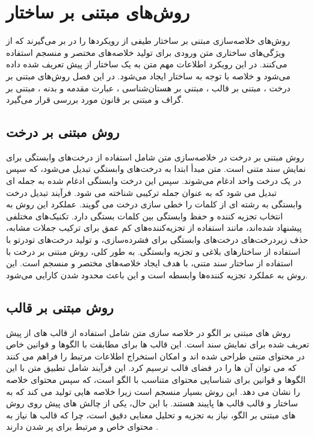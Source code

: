\chapter{روش‌های مبتنی بر ساختار}

روش‌های خلاصه‌سازی مبتنی بر ساختار طیفی از رویکردها را در بر می‌گیرند که از ویژگی‌های ساختاری متن ورودی برای تولید خلاصه‌های مختصر و منسجم استفاده می‌کنند. در این رویکرد اطلاعات مهم متن به یک ساختار از پیش تعریف شده داده می‌شود و خلاصه با توجه به ساختار ایجاد می‌شود. در این فصل روش‌های مبتنی بر درخت 
، مبتنی بر قالب
، مبتنی بر هستان‌شناسی
، عبارت مقدمه و بدنه
، مبتنی بر گراف 
و مبتنی بر قانون
 مورد بررسی قرار می‌گیرد. 
 
\section{روش مبتنی بر درخت}
روش مبتنی بر درخت در خلاصه‌سازی متن شامل استفاده از درخت‌های وابستگی برای نمایش سند متنی است. متن مبدأ ابتدا به درخت‌های وابستگی تبدیل می‌شود، که سپس در یک درخت واحد ادغام می‌شوند. سپس این درخت وابستگی ادغام شده به جمله ای تبدیل می شود که به عنوان جمله ترکیبی شناخته می شود. فرآیند تبدیل درخت وابستگی به رشته ای از کلمات را خطی سازی درخت می گویند. عملکرد این روش به انتخاب تجزیه کننده و حفظ وابستگی بین کلمات بستگی دارد. تکنیک‌های مختلفی پیشنهاد شده‌اند، مانند استفاده از تجزیه‌کننده‌های کم عمق برای ترکیب جملات مشابه، حذف زیردرخت‌های درخت‌های وابستگی برای فشرده‌سازی، و تولید درخت‌های تودرتو با استفاده از ساختارهای بلاغی و تجزیه وابستگی. به طور کلی، روش مبتنی بر درخت با استفاده از ساختار سند متنی، با هدف ایجاد خلاصه‌های مختصر و منسجم است.
این روش به عملکرد  تجزیه کننده‌ها وابسطه است و این باعث محدود شدن کارایی می‌شود\cite{andhale2016overview}.

\section{روش مبتنی بر قالب}
روش های مبتنی بر الگو در خلاصه سازی متن شامل استفاده از قالب های از پیش تعریف شده برای نمایش سند است. این قالب ها برای مطابقت با الگوها و قوانین خاص در محتوای متنی طراحی شده اند و امکان استخراج اطلاعات مرتبط را فراهم می کنند که می توان آن ها را در فضای قالب ترسیم کرد. این فرآیند شامل تطبیق متن با این الگوها و قوانین برای شناسایی محتوای متناسب با الگو است، که سپس محتوای خلاصه را نشان می دهد. این روش بسیار منسجم است زیرا خلاصه هایی تولید می کند که به ساختار و قالب قالب ها پایبند هستند. با این حال، یکی از چالش های پیش روی روش های مبتنی بر الگو، نیاز به تجزیه و تحلیل معنایی دقیق است، چرا که قالب ها نیاز به محتوای خاص و مرتبط برای پر شدن دارند
\cite{andhale2016overview}.
